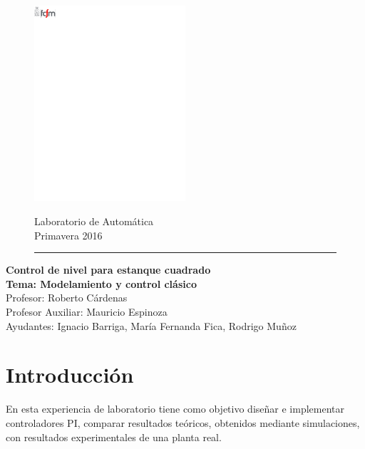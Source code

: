 \documentclass[11pt,letterpaper,notitlepage]{article}
\begin{document}
\begin{figure}
\vspace*{-1cm}
\begin{minipage}[c]{0.4\textwidth}
	\includegraphics[width=0.5\textwidth]{fcfm}
\end{minipage}
\hfill
    \begin{minipage}[t]{0.6\textwidth}
    \begin{flushright}
    	Laboratorio de Automática\\
    	Primavera 2016 \\
    \end{flushright}
\end{minipage}
\rule{\linewidth}{.4mm}
\end{figure}

\begin{center}
\huge \textbf{Control de nivel para estanque cuadrado} \\
\Large \textbf{Tema: Modelamiento y control clásico}\\
\large Profesor: Roberto Cárdenas\\
\large Profesor Auxiliar: Mauricio Espinoza\\
\large Ayudantes: Ignacio Barriga, María Fernanda Fica, Rodrigo Muñoz\\
\end{center}

\section{Introducción}

En esta experiencia de laboratorio tiene como objetivo diseñar e implementar controladores PI, comparar resultados teóricos, obtenidos mediante simulaciones, con resultados experimentales de una planta real.
\end{document}
